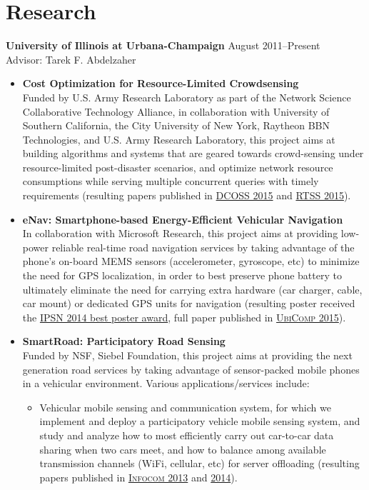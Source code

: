 \section{\sc Research} {\bf University of Illinois at Urbana-Champaign} \hfill August 2011--Present\\
Advisor: Tarek F. Abdelzaher
\begin{itemize}
\item \textbf{Cost Optimization for Resource-Limited Crowdsensing}\\ Funded by U.S. Army Research Laboratory as part of the Network Science Collaborative Technology Alliance, in collaboration with University of Southern California, the City University of New York, Raytheon BBN Technologies, and U.S. Army Research Laboratory, this project aims at building algorithms and systems that are geared towards crowd-sensing under resource-limited post-disaster scenarios, and optimize network resource consumptions while serving multiple concurrent queries with timely requirements (resulting papers published in \hyperlink{hu2015dcoss}{\textsc{DCOSS 2015}} and \hyperlink{hu2015rtss}{\textsc{RTSS 2015}}).

\item \textbf{eNav: Smartphone-based Energy-Efficient Vehicular Navigation}\\ In collaboration with Microsoft Research, this project aims at providing low-power reliable real-time road navigation services by taking advantage of the phone's on-board MEMS sensors (accelerometer, gyroscope, etc) to minimize the need for GPS localization, in order to best preserve phone battery to ultimately eliminate the need for carrying extra hardware (car charger, cable, car mount) or dedicated GPS units for navigation (resulting poster received the \hyperlink{hu2014ipsn}{IPSN 2014 best poster award}, full paper published in \hyperlink{hu2015ubicomp}{\textsc{UbiComp 2015}}).

\item \textbf{SmartRoad: Participatory Road Sensing} \\
Funded by NSF, Siebel Foundation, this project aims at providing the next generation road services by taking advantage of sensor-packed mobile phones in a vehicular environment. Various applications/services include:
\begin{itemize}
\item Vehicular mobile sensing and communication system, for which we implement and deploy a participatory vehicle mobile sensing system, and study and analyze how to most efficiently carry out car-to-car data sharing when two cars meet, and how to balance among available transmission channels (WiFi, cellular, etc) for server offloading (resulting papers published in \hyperlink{liu2013infocom}{\textsc{Infocom 2013}} and \hyperlink{hu2014infocom}{\textsc{2014}}).


\end{itemize}
\end{itemize}

